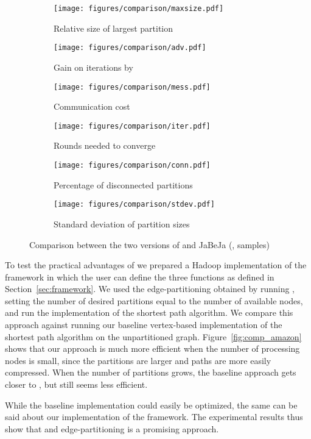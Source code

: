 \begin{figure*}
\setlength{\belowcaptionskip}{-5pt}

\begin{center}
\begin{subfigure}[b]{0.3\textwidth}
\texttt{[image: figures/comparison/maxsize.pdf]}
\caption{Relative size of largest partition}
\label{}
\end{subfigure}
\begin{subfigure}[b]{0.3\textwidth}
\texttt{[image: figures/comparison/adv.pdf]}
\caption{Gain on iterations by \etsch}
\label{}
\end{subfigure}
\begin{subfigure}[b]{0.3\textwidth}
\texttt{[image: figures/comparison/mess.pdf]}
\caption{Communication cost}
\label{}
\end{subfigure}
\end{center}


\vspace{-8pt}
\begin{center}
\begin{subfigure}[b]{0.3\textwidth}
\texttt{[image: figures/comparison/iter.pdf]}
\caption{Rounds needed to converge}
\label{}
\end{subfigure}
\begin{subfigure}[b]{0.3\textwidth}
\texttt{[image: figures/comparison/conn.pdf]}
\caption{Percentage of disconnected partitions}
\label{}
\end{subfigure}
\begin{subfigure}[b]{0.3\textwidth}
\texttt{[image: figures/comparison/stdev.pdf]}
\caption{Standard deviation of partition sizes}
\label{}
\end{subfigure}
\end{center}


\caption{Comparison between the two versions of \dfep and JaBeJa (,  samples)}
\label{fig:comparison}
\end{figure*}

To test the practical advantages of \etsch we prepared a Hadoop implementation
of the framework in which the user can define the three functions as defined in
Section~\ref{sec:framework}. We used the edge-partitioning obtained by running
\dfep, setting the number of desired partitions equal to the number of
available nodes, and run the \etsch implementation of the shortest path
algorithm. We compare this approach against running our baseline vertex-based
implementation of the shortest path algorithm on the unpartitioned graph.
Figure~\ref{fig:comp_amazon} shows that our approach is much more efficient
when the number of processing nodes is small, since the partitions are larger
and paths are more easily compressed. When the number of partitions grows, the
baseline approach gets closer to \etsch, but still seems less efficient.

While the baseline implementation could easily be optimized, the same can be
said about our implementation of the \etsch framework.
The experimental results thus show that \etsch and edge-partitioning is a 
promising approach.



